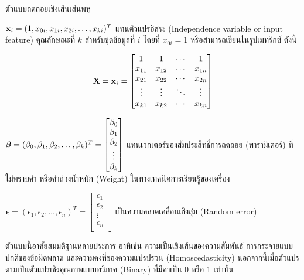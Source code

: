 \begin{myBox}[]{ตัวแบบถดถอยเชิงเส้นเส้นพหุ}{}

\indent\indent
$\mathbf{x}_i = (1, x_{0i},x_{1i}, x_{2i}, \ldots, x_{ki})^T$ แทนตัวแปรอิสระ (Independence variable or input feature) คุณลักษณะที่ $k$ สำหรับชุดข้อมูลที่ $i$
โดยที่ $x_{0i}=1$ หรือสามารถเขียนในรูปเมทริกซ์ ดังนี้

$$\mathbf{X}=\mathbf{x}_i=\begin{bmatrix}
	1 & 1 & \cdots  & 1 \\
	x_{11}& x_{12}& \cdots  & x_{1n} \\
	x_{21}& x_{22}& \cdots & x_{2n}  \\
	\vdots & \vdots  & \ddots  & \vdots  \\
	x_{k1}& x_{k2} & \cdots  & x_{kn} \\
\end{bmatrix}$$

\indent\indent
$\boldsymbol{\beta} = (\beta_0, \beta_1, \beta_2, \ldots, \beta_k)^T=\begin{bmatrix}
	\beta_{0}\\
	\beta_{1} \\
	\beta_{2} \\
	\vdots \\
	\beta_{k} \\
\end{bmatrix}$ แทนเวกเตอร์ของสัมประสิทธิ์การถดถอย (พารามิเตอร์) ที่ไม่ทราบค่า หรือค่าถ่วงน้ำหนัก (Weight) ในทางเทคนิคการเรียนรู้ของเครื่อง

\indent\indent
$\bm{\epsilon}=(\epsilon_1, \epsilon_2, \ldots, \epsilon_n)^T=\begin{bmatrix}
	\epsilon_{1} \\
	\epsilon_{2} \\
	\vdots \\
	\epsilon_{n} \\
\end{bmatrix}$ เป็นความคลาดเคลื่อนเชิงสุ่ม (Random error)
\end{myBox}


ตัวแบบนี้อาศัยสมมติฐานหลายประการ อาทิเช่น ความเป็นเชิงเส้นของความสัมพันธ์ การกระจายแบบปกติของข้อผิดพลาด และความคงที่ของความแปรปรวน (Homoscedasticity) นอกจากนี้เมื่อตัวแปรตามเป็นตัวแปรเชิงคุณภาพแบบทวิภาค (Binary) ที่มีค่าเป็น 0 หรือ 1 เท่านั้น


